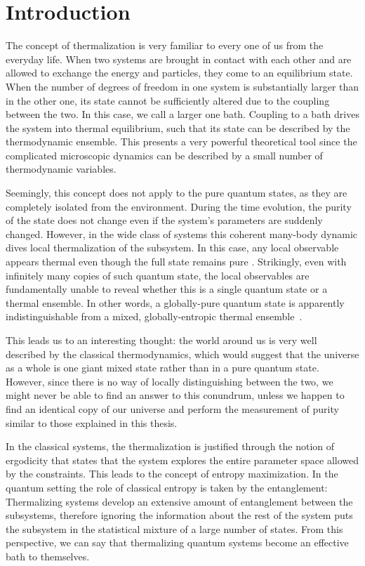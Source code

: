 \chapter{Introduction}
\label{introduction}

The concept of thermalization is very familiar to every one of us from the everyday life. When two systems are brought in contact with each other and are allowed to exchange the energy and particles, they come to an equilibrium state. When the number of degrees of freedom in one system is substantially larger than in the other one, its state cannot be sufficiently altered due to the coupling between the two. In this case, we call a larger one bath. Coupling to a bath drives the system into thermal equilibrium, such that its state can be described by the thermodynamic ensemble. This presents a very powerful theoretical tool since the complicated microscopic dynamics can be described by a small number of thermodynamic variables.

Seemingly, this concept does not apply to the pure quantum states, as they are completely isolated from the environment. During the time evolution, the purity of the state does not change even if the system's parameters are suddenly changed. However, in the wide class of systems this coherent many-body dynamic dives local thermalization of the subsystem. In this case, any local observable appears thermal even though the full state remains pure \cite{Deutsch1991, Olshanii2008,Eisert2015}. Strikingly, even with infinitely many copies of such quantum state, the local observables are fundamentally unable to reveal whether this is a single quantum state or a thermal ensemble. In other words, a globally-pure quantum state is apparently indistinguishable from a mixed, globally-entropic thermal ensemble~\cite{Shankar1985, Deutsch1991, SrendickiETH, Olshanii2008}.

This leads us to an interesting thought: the world around us is very well described by the classical thermodynamics, which would suggest that the universe as a whole is one giant mixed state rather than in a pure quantum state. However, since there is no way of locally distinguishing between the two, we might never be able to find an answer to this conundrum, unless we happen to find an identical copy of our universe and perform the measurement of purity similar to those explained in this thesis.

In the classical systems, the thermalization is justified through the notion of ergodicity that states that the system explores the entire parameter space allowed by the constraints. This leads to the concept of entropy maximization. In the quantum setting the role of classical entropy is taken by the entanglement: Thermalizing systems develop an extensive amount of entanglement between the subsystems, therefore ignoring the information about the rest of the system puts the subsystem in the statistical mixture of a large number of states. From this perspective, we can say that thermalizing quantum systems become an effective bath to themselves.

